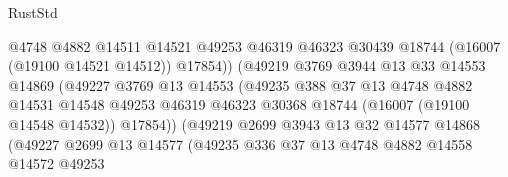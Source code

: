 \begin{lexlean}{RustStd}
\begin{coremodule}
                                      @4748
                                      @4882
                                      @14511
                                      @14521
                                      @49253
                                      @46319
                                      @46323
                                      @30439
                                      @18744
                                      (@16007 (@19100 @14521 @14512))
                                      @17854))
                                  (@49219
                                    @3769
                                    @3944
                                    @13
                                    @33
                                    @14553
                                    @14869
                                    (@49227
                                      @3769
                                      @13
                                      @14553
                                      (@49235
                                        @388
                                        @37
                                        @13
                                        @4748
                                        @4882
                                        @14531
                                        @14548
                                        @49253
                                        @46319
                                        @46323
                                        @30368
                                        @18744
                                        (@16007 (@19100 @14548 @14532))
                                        @17854))
                                    (@49219
                                      @2699
                                      @3943
                                      @13
                                      @32
                                      @14577
                                      @14868
                                      (@49227
                                        @2699
                                        @13
                                        @14577
                                        (@49235
                                          @336
                                          @37
                                          @13
                                          @4748
                                          @4882
                                          @14558
                                          @14572
                                          @49253

\end{coremodule}
\end{lexlean}
